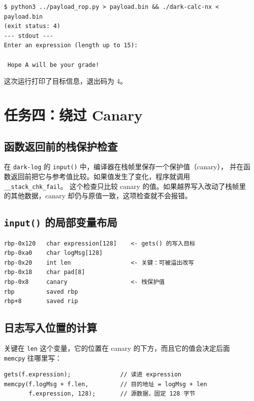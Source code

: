 \documentclass[UTF8,a4paper,12pt,fontset=windows]{ctexart}
\newcommand{\code}[1]{\texttt{#1}}
\begin{document}
\begin{lstlisting}
$ python3 ../payload_rop.py > payload.bin && ./dark-calc-nx < payload.bin
(exit status: 4)
--- stdout ---
Enter an expression (length up to 15):

 Hope A will be your grade!
\end{lstlisting}

这次运行打印了目标信息，退出码为 4。

\section{任务四：绕过 Canary}

\subsection{函数返回前的栈保护检查}

在 \code{dark-log} 的 \code{input()} 中，编译器在栈帧里保存一个保护值（canary），
并在函数返回前把它与参考值比较。如果值发生了变化，程序就调用 \code{\_\_stack\_chk\_fail}。
这个检查只比较 canary 的值。如果越界写入改动了栈帧里的其他数据，canary 却仍与原值一致，这项检查就不会报错。

\subsection{\texorpdfstring{\code{input()}}{input()} 的局部变量布局}

\begin{lstlisting}
rbp-0x120   char expression[128]    <- gets() 的写入目标
rbp-0xa0    char logMsg[128]
rbp-0x20    int len                 <- 关键：可被溢出改写
rbp-0x18    char pad[8]
rbp-0x8     canary                  <- 栈保护值
rbp         saved rbp
rbp+8       saved rip
\end{lstlisting}

\subsection{日志写入位置的计算}

关键在 \code{len} 这个变量，它的位置在 canary 的下方，而且它的值会决定后面
\code{memcpy} 往哪里写：

\begin{lstlisting}
gets(f.expression);              // 读进 expression
memcpy(f.logMsg + f.len,         // 目的地址 = logMsg + len
       f.expression, 128);       // 源数据，固定 128 字节
\end{lstlisting}
\end{document}
